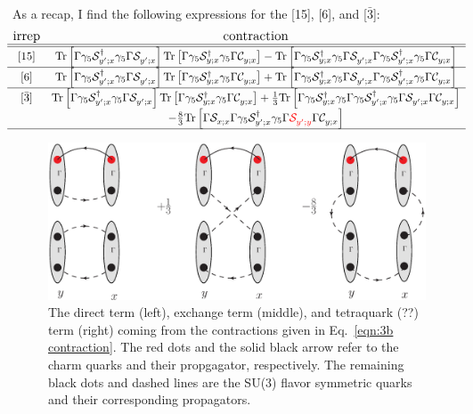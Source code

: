 \documentclass[11pt]{article}
\begin{document}
As a recap, I find the following expressions for the [15], [6], and [$\bar{3}$]:
{\tiny
\begin{displaymath}
\begin{matrix}
{\large\text{irrep}} & {\large\text{contraction}} \\
\hline
\hline
 [15]&\text{Tr}\left[\Gamma \gamma_5\mathcal{S}^\dag_{y';x}\gamma_5\Gamma\mathcal{S}^{}_{y';x}\right]
\text{Tr}\left[\Gamma \gamma_5\mathcal{S}^\dag_{y;x}\gamma_5\Gamma\mathcal{C}^{}_{y;x}\right]
-\text{Tr}\left[\Gamma \gamma_5\mathcal{S}^\dag_{y;x}\gamma_5\Gamma\mathcal{S}^{}_{y';x}\Gamma \gamma_5\mathcal{S}^\dag_{y';x}\gamma_5\Gamma\mathcal{C}^{}_{y;x}\right] \\
\hline
 [6]&\text{Tr}\left[\Gamma \gamma_5\mathcal{S}^\dag_{y';x}\gamma_5\Gamma\mathcal{S}^{}_{y';x}\right]
\text{Tr}\left[\Gamma \gamma_5\mathcal{S}^\dag_{y;x}\gamma_5\Gamma\mathcal{C}^{}_{y;x}\right]
+\text{Tr}\left[\Gamma \gamma_5\mathcal{S}^\dag_{y;x}\gamma_5\Gamma\mathcal{S}^{}_{y';x}\Gamma \gamma_5\mathcal{S}^\dag_{y';x}\gamma_5\Gamma\mathcal{C}^{}_{y;x}\right] \\
\hline
 [\bar{3}]& \text{Tr}\left[\Gamma \gamma_5\mathcal{S}^\dag_{y'; x}\gamma_5\Gamma\mathcal{S}^{}_{y';x}\right]
\text{Tr}\left[\Gamma \gamma_5\mathcal{S}^\dag_{y; x}\gamma_5\Gamma\mathcal{C}^{}_{y; x}\right]
+\frac{1}{3}\text{Tr}\left[\Gamma \gamma_5\mathcal{S}^\dag_{y; x}\gamma_5\Gamma\gamma_5\mathcal{S}^\dag_{y'; x}\gamma_5\Gamma \mathcal{S}^{}_{y'; x}\Gamma\mathcal{C}^{}_{y; x}\right]\\
&-\frac{8}{3}\text{Tr}\left[\Gamma \mathcal{S}^{}_{x; x}\Gamma\gamma_5\mathcal{S}^\dag_{y'; x}\gamma_5\Gamma {\color{red}\mathcal{S}^{}_{y'; y}}\Gamma\mathcal{C}^{}_{y; x}\right]\\
\hline
\end{matrix}
\end{displaymath}
}

\begin{figure}
\center
\includegraphics[width=.8\columnwidth]{contract2.eps}
\caption{The direct term (left), exchange term (middle), and tetraquark (??) term (right) coming from the contractions given in Eq.~\eqref{eqn:3b contraction}.  The red dots and the solid black arrow refer to the charm quarks and their propgagator, respectively.  The remaining black dots and dashed lines are the SU(3) flavor symmetric quarks and their corresponding propagators. \label{fig:3b}}
\end{figure}
\end{document}
